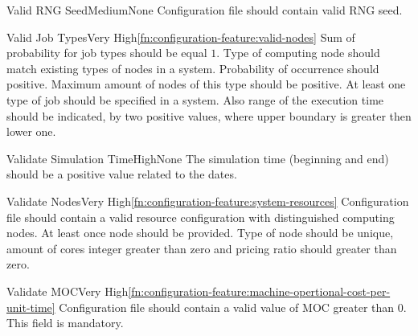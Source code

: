 		
	\begin{functional}{Valid \gls{RNG} Seed}{Medium}{None}
		\label{fn:configuration-feature:valid-rng-seed}
		{
			Configuration file should contain valid \gls{RNG} seed.
		}
	\end{functional}
	
	\begin{functional}{Valid Job Types}{Very High}{\ref{fn:configuration-feature:valid-nodes}}
		\label{fn:configuration-feature:valid-job-types}
		{
			Sum of probability for job types should be equal $1$. Type of \gls{computing node} should match existing types of nodes in a system. Probability of occurrence should positive. Maximum amount of nodes of this type should be positive. At least one type of job should be specified in a system. Also range of the execution time should be indicated, by two positive values, where upper boundary is greater then lower one.
		}
	\end{functional}

	\begin{functional}{Validate Simulation Time}{High}{None}
		\label{fn:configuration-feature:validate-simulation-time}
		{
			The simulation time (beginning and end) should be a positive value related to the dates. 
		}
	\end{functional}

	\begin{functional}{Validate Nodes}{Very High}{\ref{fn:configuration-feature:system-resources}}
		\label{fn:configuration-feature:valid-nodes}
		{
			Configuration file should contain a valid resource configuration with distinguished \gls{computing node}s. At least once node should be provided. Type of node should be unique, amount of cores integer greater than zero and pricing ratio should greater than zero.  
		}
	\end{functional}

	\begin{functional}{Validate \gls{MOC}}{Very High}{\ref{fn:configuration-feature:machine-opertional-cost-per-unit-time}}
		\label{fn:configuration-feature:valid-moc}
		{
			Configuration file should contain a valid value of \gls{MOC} greater than $0$. This field is mandatory.
		}
	\end{functional}

